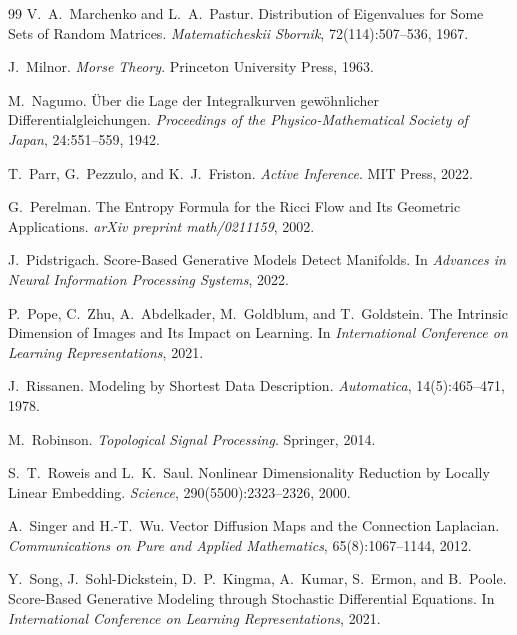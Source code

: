 \documentclass[11pt,a4paper]{article}
\theoremstyle{definition}
\theoremstyle{remark}
\begin{document}
\begin{thebibliography}{99}
V.~A.~Marchenko and L.~A.~Pastur.
\newblock Distribution of Eigenvalues for Some Sets of Random Matrices.
\newblock \emph{Matematicheskii Sbornik}, 72(114):507--536, 1967.

J.~Milnor.
\newblock \emph{Morse Theory}.
\newblock Princeton University Press, 1963.

M.~Nagumo.
\newblock \"Uber die Lage der Integralkurven gew\"ohnlicher Differentialgleichungen.
\newblock \emph{Proceedings of the Physico-Mathematical Society of Japan}, 24:551--559, 1942.

T.~Parr, G.~Pezzulo, and K.~J.~Friston.
\newblock \emph{Active Inference}.
\newblock MIT Press, 2022.

G.~Perelman.
\newblock The Entropy Formula for the Ricci Flow and Its Geometric Applications.
\newblock \emph{arXiv preprint math/0211159}, 2002.

J.~Pidstrigach.
\newblock Score-Based Generative Models Detect Manifolds.
\newblock In \emph{Advances in Neural Information Processing Systems}, 2022.

P.~Pope, C.~Zhu, A.~Abdelkader, M.~Goldblum, and T.~Goldstein.
\newblock The Intrinsic Dimension of Images and Its Impact on Learning.
\newblock In \emph{International Conference on Learning Representations}, 2021.

J.~Rissanen.
\newblock Modeling by Shortest Data Description.
\newblock \emph{Automatica}, 14(5):465--471, 1978.

M.~Robinson.
\newblock \emph{Topological Signal Processing}.
\newblock Springer, 2014.

S.~T.~Roweis and L.~K.~Saul.
\newblock Nonlinear Dimensionality Reduction by Locally Linear Embedding.
\newblock \emph{Science}, 290(5500):2323--2326, 2000.

A.~Singer and H.-T.~Wu.
\newblock Vector Diffusion Maps and the Connection Laplacian.
\newblock \emph{Communications on Pure and Applied Mathematics}, 65(8):1067--1144, 2012.

Y.~Song, J.~Sohl-Dickstein, D.~P.~Kingma, A.~Kumar, S.~Ermon, and B.~Poole.
\newblock Score-Based Generative Modeling through Stochastic Differential Equations.
\newblock In \emph{International Conference on Learning Representations}, 2021.


\end{thebibliography}
\end{document}
